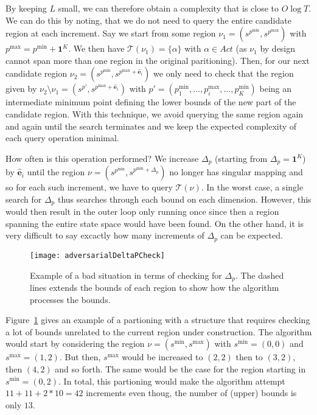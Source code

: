 By keeping $L$ small, we can therefore obtain a complexity that is close to $O
\log T$. We can do this by noting, that we do not need to query the entire
candidate region at each increment. Say we start from some region $\nu_{1} =
(s^{p^{\min}}, s^{p^{\max}})$ with $p^{\max} = p^{\min} + \mathbf{1}^{K}$. We
then have $\mathcal{T}(\nu_{1}) = \{ \alpha \}$ with $\alpha \in Act$ (as
$\nu_{1}$ by design cannot span more than one region in the original
paritioning). Then, for our next candidate region $\nu_{2} = (s^{p^{\min}},
s^{p^{\max} + \mathbf{\hat{e}}_{i}})$ we only need to check that the region
given by $\nu_{2} \setminus \nu_{1} = (s^{p'}, s^{p^{\max} +
\mathbf{\hat{e}}_{i}})$ with $p' = (p^{\min}_{1}, \ldots, p^{\max}_{i}, \ldots,
p^{\min}_{K})$ being an intermediate minimum point defining the lower bounds of
the new part of the candidate region. With this technique, we avoid querying the
same region again and again until the search terminates and we keep the expected
complexity of each query operation minimal.

How often is this operation performed? We increase $\Delta_{p}$ (starting from
$\Delta_{p} = \mathbf{1}^{K}$) by $\mathbf{\hat{e}}_{i}$ until the region $\nu =
(s^{p^{\min}}, s^{p^{\min} + \Delta_{p}})$ no longer has singular mapping and so
for each such increment, we have to query $\mathcal{T}(\nu)$. In the worst case,
a single search for $\Delta_{p}$ thus searches through each bound on each
dimension. However, this would then result in the outer loop only running once
since then a region spanning the entire state space would have been found. On
the other hand, it is very difficult to say excactly how many increments of
$\Delta_{p}$ can be expected.

\begin{figure}[htpb]
    \centering
    \texttt{[image: adversarialDeltaPCheck]}
    \caption{%
        Example of a bad situation in terms of checking for $\Delta_{p}$. The
        dashed lines extends the bounds of each region to show how the algorithm
        processes the bounds.
    }\label{fig:adversarialDeltaPCheck}
\end{figure}

Figure~\ref{fig:adversarialDeltaPCheck} gives an example of a partioning with a
structure that requires checking a lot of bounds unrelated to the current region
under construction. The algorithm would start by considering the region $\nu =
(s^{\min}, s^{\max})$ with $s^{\min} = (0,0)$ and $s^{\max} = (1,2)$. But then,
$s^{\max}$ would be increased to $(2,2)$ then to $(3,2)$, then $(4,2)$ and so
forth. The same would be the case for the region starting in $s^{\min} = (0,2)$.
In total, this partioning would make the algorithm attempt $11 + 11 + 2*10 = 42$
increments even thoug, the number of (upper) bounds is only $13$.



